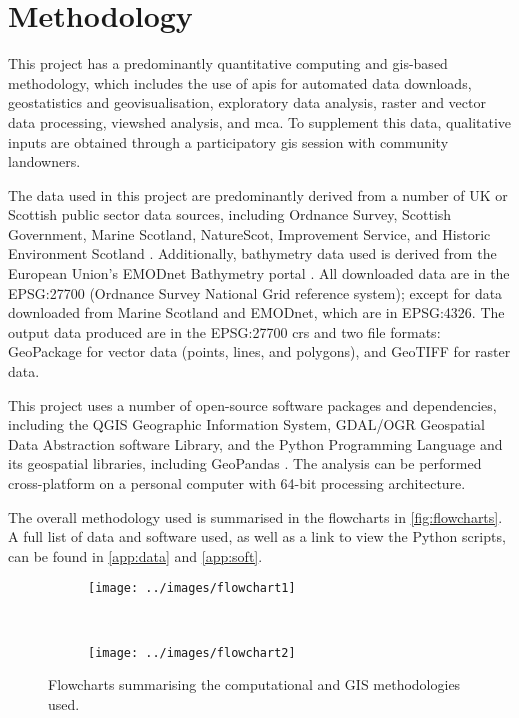 \chapter{Methodology}

This project has a predominantly quantitative computing and \gls{gis}-based methodology, which includes the use of \glspl{api} for automated data downloads, geostatistics and geovisualisation, exploratory data analysis, raster and vector data processing, viewshed analysis, and \gls{mca}. To supplement this data, qualitative inputs are obtained through a participatory \gls{gis} session with community landowners.

The data used in this project are predominantly derived from a number of UK or Scottish public sector data sources, including Ordnance Survey, Scottish Government, Marine Scotland, NatureScot, Improvement Service, and Historic Environment Scotland \autocite{os-downloads,spatialdata}. Additionally, bathymetry data used is derived from the European Union's EMODnet Bathymetry portal \autocite{emodnet-bathymetry}. All downloaded data are in the EPSG:27700 (Ordnance Survey National Grid reference system); except for data downloaded from Marine Scotland and EMODnet, which are in EPSG:4326. The output data produced are in the EPSG:27700 \gls{crs} and two file formats: GeoPackage for vector data (points, lines, and polygons), and GeoTIFF for raster data.

This project uses a number of open-source software packages and dependencies, including the QGIS Geographic Information System, GDAL/OGR Geospatial Data Abstraction software Library, and the Python Programming Language and its geospatial libraries, including GeoPandas \autocite{qgis,gdal,python,geopandas}. The analysis can be performed cross-platform on a personal computer with 64-bit processing architecture.

The overall methodology used is summarised in the flowcharts in \autoref{fig:flowcharts}. A full list of data and software used, as well as a link to view the Python scripts, can be found in \autoref{app:data} and \autoref{app:soft}.

\begin{figure}
  \centering
  \begin{subfigure}[t]{.96\textwidth}
    \centering
    \texttt{[image: ../images/flowchart1]}
  \end{subfigure}
  \\
  \begin{subfigure}[t]{.96\textwidth}
    \centering
    \texttt{[image: ../images/flowchart2]}
  \end{subfigure}
  \caption{Flowcharts summarising the computational and GIS methodologies used. \label{fig:flowcharts}}
\end{figure}

